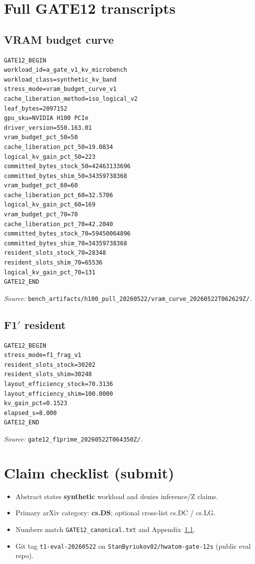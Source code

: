 \documentclass[11pt]{article}
\begin{document}
\appendix

\section{Full GATE12 transcripts}
\label{app:gate12}

\subsection{VRAM budget curve}
\label{app:curve}
\begin{lstlisting}
GATE12_BEGIN
workload_id=a_gate_v1_kv_microbench
workload_class=synthetic_kv_band
stress_mode=vram_budget_curve_v1
cache_liberation_method=iso_logical_v2
leaf_bytes=2097152
gpu_sku=NVIDIA H100 PCIe
driver_version=550.163.01
vram_budget_pct_50=50
cache_liberation_pct_50=19.0834
logical_kv_gain_pct_50=223
committed_bytes_stock_50=42463133696
committed_bytes_shim_50=34359738368
vram_budget_pct_60=60
cache_liberation_pct_60=32.5706
logical_kv_gain_pct_60=169
vram_budget_pct_70=70
cache_liberation_pct_70=42.2040
committed_bytes_stock_70=59450064896
committed_bytes_shim_70=34359738368
resident_slots_stock_70=28348
resident_slots_shim_70=65536
logical_kv_gain_pct_70=131
GATE12_END
\end{lstlisting}
\emph{Source:} \texttt{bench\_artifacts/h100\_pull\_20260522/vram\_curve\_20260522T062629Z/}.

\subsection{F1$'$ resident}
\begin{lstlisting}
GATE12_BEGIN
stress_mode=f1_frag_v1
resident_slots_stock=30202
resident_slots_shim=30248
layout_efficiency_stock=70.3136
layout_efficiency_shim=100.0000
kv_gain_pct=0.1523
elapsed_s=8.000
GATE12_END
\end{lstlisting}
\emph{Source:} \texttt{gate12\_f1prime\_20260522T064350Z/}.

\section{Claim checklist (submit)}
\begin{itemize}
  \item Abstract states \textbf{synthetic} workload and denies inference/Z claims.
  \item Primary arXiv category: \textbf{cs.DS}; optional cross-list cs.DC / cs.LG.
  \item Numbers match \texttt{GATE12\_canonical.txt} and Appendix~\ref{app:curve}.
  \item Git tag \texttt{t1-eval-20260522} on \texttt{StanByriukov02/hwatom-gate-12s} (public eval repo).
\end{itemize}



\end{document}
